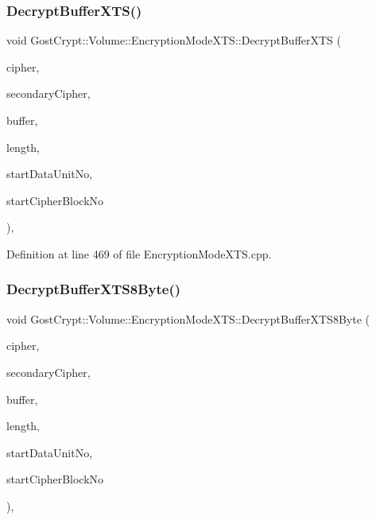 \subsubsection{\texorpdfstring{Decrypt\+Buffer\+X\+T\+S()}{DecryptBufferXTS()}}
{\footnotesize\ttfamily void Gost\+Crypt\+::\+Volume\+::\+Encryption\+Mode\+X\+T\+S\+::\+Decrypt\+Buffer\+X\+TS (\begin{DoxyParamCaption}\item[{const \hyperlink{class_gost_crypt_1_1_volume_1_1_cipher_algorithm}{Cipher\+Algorithm} \&}]{cipher,  }\item[{const \hyperlink{class_gost_crypt_1_1_volume_1_1_cipher_algorithm}{Cipher\+Algorithm} \&}]{secondary\+Cipher,  }\item[{quint8 $\ast$}]{buffer,  }\item[{quint64}]{length,  }\item[{quint64}]{start\+Data\+Unit\+No,  }\item[{unsigned int}]{start\+Cipher\+Block\+No }\end{DoxyParamCaption})\hspace{0.3cm}{\ttfamily [static]}, {\ttfamily [protected]}}



Definition at line 469 of file Encryption\+Mode\+X\+T\+S.\+cpp.

\mbox{\label{class_gost_crypt_1_1_volume_1_1_encryption_mode_x_t_s_a3577c8735d4ef23c1155315a2555d97b}} 
\subsubsection{\texorpdfstring{Decrypt\+Buffer\+X\+T\+S8\+Byte()}{DecryptBufferXTS8Byte()}}
{\footnotesize\ttfamily void Gost\+Crypt\+::\+Volume\+::\+Encryption\+Mode\+X\+T\+S\+::\+Decrypt\+Buffer\+X\+T\+S8\+Byte (\begin{DoxyParamCaption}\item[{const \hyperlink{class_gost_crypt_1_1_volume_1_1_cipher_algorithm}{Cipher\+Algorithm} \&}]{cipher,  }\item[{const \hyperlink{class_gost_crypt_1_1_volume_1_1_cipher_algorithm}{Cipher\+Algorithm} \&}]{secondary\+Cipher,  }\item[{quint8 $\ast$}]{buffer,  }\item[{quint64}]{length,  }\item[{quint64}]{start\+Data\+Unit\+No,  }\item[{unsigned int}]{start\+Cipher\+Block\+No }\end{DoxyParamCaption})\hspace{0.3cm}{\ttfamily [static]}, {\ttfamily [protected]}}



